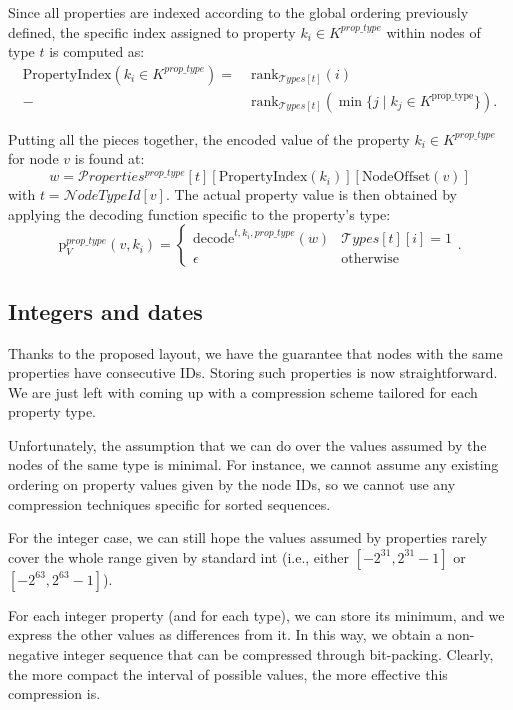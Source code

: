 Since all properties are indexed according to the global ordering previously defined, the specific index assigned to property \( k_i \in K^{prop\_type} \) within nodes of type \( t \) is computed as:
\[
\begin{aligned}
\mathrm{PropertyIndex}(k_i \in K^{\textit{prop\_type}})
= \; & \text{rank}_{\mathcal Types[t]}(i) \\
     - & \text{rank}_{\mathcal Types[t]}\left( \min \{ j \mid k_j \in K^{\text{prop\_type}} \} \right).
\end{aligned}
\]



Putting all the pieces together, the encoded value of the property \( k_i \in K^{prop\_type} \) for node \( v \) is found at:
\[
    w = \mathcal Properties^{\textit{prop\_type}}[t][\mathrm{PropertyIndex}(k_i)][\mathrm{NodeOffset}(v)]
\]
with \( t = \mathcal NodeTypeId [v] \). The actual property value is then obtained by applying the decoding function specific to the property's type:
\[
\mathrm p_V^{prop\_type}(v, k_i) =
\begin{cases}
\mathrm{decode}^{t, k_i, \mathit{prop\_type}}(w) & \mathcal Types [t][i] = 1 \\
\epsilon & \text{otherwise}
\end{cases}.
\]


\subsection{Integers and dates}
Thanks to the proposed layout, we have the guarantee that nodes with the same properties have consecutive IDs. Storing such properties is now straightforward. We are just left with coming up with a compression scheme tailored for each property type.

Unfortunately, the assumption that we can do over the values assumed by the nodes of the same type is minimal. For instance, we cannot assume any existing ordering on property values given by the node IDs, so we cannot use any compression techniques specific for sorted sequences.


For the integer case, we can still hope the values assumed by properties rarely cover the whole range given by standard int (i.e., either $[-2^{31}, 2^{31} - 1]$ or $[-2^{63}, 2^{63} - 1]$).

For each integer property (and for each type), we can store its minimum, and we express the other values as differences from it. In this way, we obtain a non-negative integer sequence that can be compressed through bit-packing. Clearly, the more compact the interval of possible values, the more effective this compression is.

